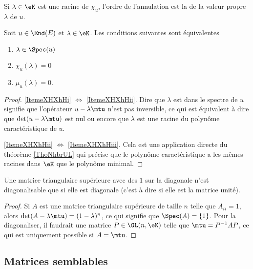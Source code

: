 Si \( \lambda\in\eK\) est une racine de \( \chi_u\), l'ordre de l'annulation est la  de la valeur propre \( \lambda\) de \( u\).

\begin{theorem}
    Soit \( u\in\End(E)\) et \( \lambda\in\eK\). Les conditions suivantes sont équivalentes
    \begin{enumerate}
        \item\label{ItemeXHXhHi}
            \( \lambda\in\Spec(u)\)
        \item\label{ItemeXHXhHii}
            \( \chi_u(\lambda)=0\)
        \item\label{ItemeXHXhHiii}
            \( \mu_u(\lambda)=0\).
    \end{enumerate}
\end{theorem}

\begin{proof}
    \ref{ItemeXHXhHi} \( \Leftrightarrow\) \ref{ItemeXHXhHii}. Dire que \( \lambda\) est dans le spectre de \( u\) signifie que l'opérateur \( u-\lambda\mtu\) n'est pas inversible, ce qui est équivalent à dire que \( \det(u-\lambda\mtu)\) est nul ou encore que \( \lambda\) est une racine du polynôme caractéristique de \( u\). 

    \ref{ItemeXHXhHii} \( \Leftrightarrow\) \ref{ItemeXHXhHiii}. Cela est une application directe du théorème \ref{ThoNhbrUL} qui précise que le polynôme caractéristique a les mêmes racines dans \(\eK\) que le polynôme minimal.
\end{proof}

\begin{lemma}
    Une matrice triangulaire supérieure avec des \( 1\) sur la diagonale n'est diagonalisable que si elle est diagonale (c'est à dire si elle est la matrice unité).
\end{lemma}

\begin{proof}
    Si \( A\) est une matrice triangulaire supérieure de taille \( n\) telle que \( A_{ii}=1\), alors \( \det(A-\lambda\mtu)=(1-\lambda)^n\), ce qui signifie que \( \Spec(A)=\{ 1 \}\). Pour la diagonaliser, il faudrait une matrice \( P\in\GL(n,\eK)\) telle que \( \mtu=P^{-1}AP\), ce qui est uniquement possible si \( A=\mtu\).
\end{proof}


\subsection{Matrices semblables}

